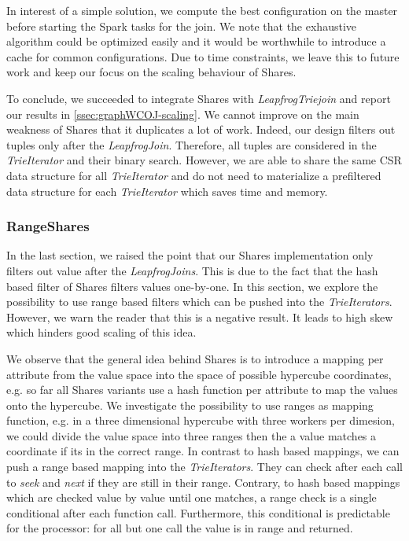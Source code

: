In interest of a simple solution, we compute the best configuration on the master before starting the Spark
tasks for the join.
We note that the exhaustive algorithm could be optimized easily and it would be worthwhile to introduce
a cache for common configurations.
Due to time constraints, we leave this to future work and keep our focus on the scaling behaviour of Shares.

To conclude, we succeeded to integrate Shares with \textit{LeapfrogTriejoin} and report our results in \cref{ssec:graphWCOJ-scaling}.
We cannot improve on the main weakness of Shares that it duplicates a lot of work.
Indeed, our design filters out tuples only after the \textit{LeapfrogJoin}.
Therefore, all tuples are considered in the \textit{TrieIterator} and their binary search.
However, we are able to share the same CSR data structure for all \textit{TrieIterator} and do not
need to materialize a prefiltered data structure for each \textit{TrieIterator} which saves time and memory.

\subsubsection{RangeShares}
In the last section, we raised the point that our Shares implementation only filters out value after the
\textit{LeapfrogJoins}.
This is due to the fact that the hash based filter of Shares filters values one-by-one.
In this section, we explore the possibility to use range based filters which can be pushed into the \textit{TrieIterators}.
However, we warn the reader that this is a negative result.
It leads to high skew which hinders good scaling of this idea.

We observe that the general idea behind Shares is to introduce a mapping per attribute from the value space into the space of possible
hypercube coordinates, e.g. so far all Shares variants use a hash function per attribute to map the values onto the hypercube.
We investigate the possibility to use ranges as mapping function, e.g. in a three dimensional hypercube with three workers per dimesion,
we could divide the value space into three ranges then the a value matches a coordinate if its in the correct range.
In contrast to hash based mappings, we can push a range based mapping into the \textit{TrieIterators}.
They can check after each call to \textit{seek} and \textit{next} if they are still in their range.
Contrary, to hash based mappings which are checked value by value until one matches, a range check is a single conditional after each
function call.
Furthermore, this conditional is predictable for the processor: for all but one call the value is in range and returned.


